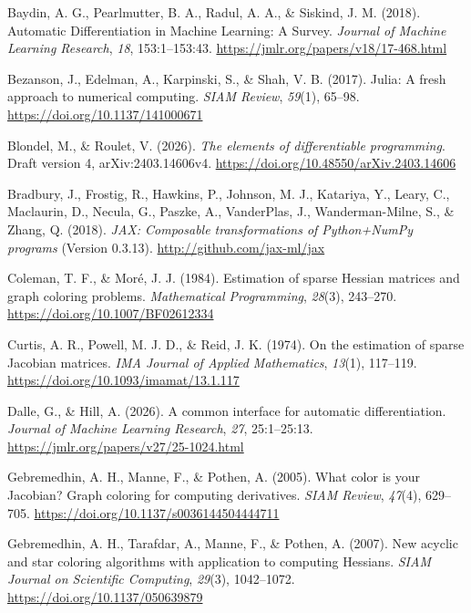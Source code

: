 \documentclass[
]{article}
\newlength{\cslhangindent}
\newenvironment{CSLReferences}[2] %
 {\begin{list}{}{%
  \setlength{\itemindent}{0pt}
  \setlength{\leftmargin}{0pt}
  \setlength{\parsep}{0pt}
  \ifodd #1
   \setlength{\leftmargin}{\cslhangindent}
   \setlength{\itemindent}{-1\cslhangindent}
  \fi
  \setlength{\itemsep}{#2\baselineskip}}}
 {\end{list}}
\begin{document}
\protect{}\label{refs}
\begin{CSLReferences}{1}{0}
Baydin, A. G., Pearlmutter, B. A., Radul, A. A., \& Siskind, J. M.
(2018). Automatic {Differentiation} in {Machine Learning}: A {Survey}.
\emph{Journal of Machine Learning Research}, \emph{18}, 153:1--153:43.
\url{https://jmlr.org/papers/v18/17-468.html}

Bezanson, J., Edelman, A., Karpinski, S., \& Shah, V. B. (2017).
{Julia}: A fresh approach to numerical computing. \emph{SIAM Review},
\emph{59}(1), 65--98. \url{https://doi.org/10.1137/141000671}

Blondel, M., \& Roulet, V. (2026). \emph{The elements of differentiable
programming}. Draft version 4, arXiv:2403.14606v4.
\url{https://doi.org/10.48550/arXiv.2403.14606}

Bradbury, J., Frostig, R., Hawkins, P., Johnson, M. J., Katariya, Y.,
Leary, C., Maclaurin, D., Necula, G., Paszke, A., VanderPlas, J.,
Wanderman-Milne, S., \& Zhang, Q. (2018). \emph{{JAX}: Composable
transformations of {{P}ython+{N}um{P}y} programs} (Version 0.3.13).
\url{http://github.com/jax-ml/jax}

Coleman, T. F., \& Moré, J. J. (1984). Estimation of sparse {Hessian}
matrices and graph coloring problems. \emph{Mathematical Programming},
\emph{28}(3), 243--270. \url{https://doi.org/10.1007/BF02612334}

Curtis, A. R., Powell, M. J. D., \& Reid, J. K. (1974). On the
estimation of sparse {Jacobian} matrices. \emph{IMA Journal of Applied
Mathematics}, \emph{13}(1), 117--119.
\url{https://doi.org/10.1093/imamat/13.1.117}

Dalle, G., \& Hill, A. (2026). A common interface for automatic
differentiation. \emph{Journal of Machine Learning Research}, \emph{27},
25:1--25:13. \url{https://jmlr.org/papers/v27/25-1024.html}

Gebremedhin, A. H., Manne, F., \& Pothen, A. (2005). What color is your
{Jacobian}? Graph coloring for computing derivatives. \emph{SIAM
Review}, \emph{47}(4), 629--705.
\url{https://doi.org/10.1137/s0036144504444711}

Gebremedhin, A. H., Tarafdar, A., Manne, F., \& Pothen, A. (2007). New
acyclic and star coloring algorithms with application to computing
{Hessians}. \emph{SIAM Journal on Scientific Computing}, \emph{29}(3),
1042--1072. \url{https://doi.org/10.1137/050639879}


\end{CSLReferences}
\end{document}
